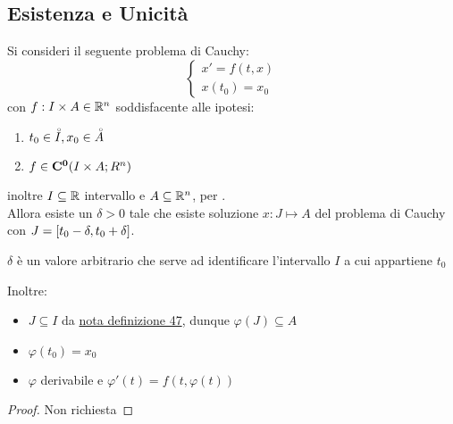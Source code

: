 \subsection{Esistenza e Unicità}
\begin{proposition}
	\label{teo:peano}
	Si consideri il seguente problema di Cauchy:
	$$\left\{\begin{matrix} x'=f(t,x)\\x(t_0)=x_0\end{matrix}\right.$$
	con $f:I\times A\in \mathbb{R}^n$ soddisfacente alle ipotesi:
	\begin{enumerate}
		\item $t_0\in \accentset{\circ}{I}, x_0\in \accentset{\circ}{A}$
		\item $f\in \mathbf{C^{0}}(I\times A;R^n)$
	\end{enumerate}
	inoltre $I\subseteq \mathbb{R}$ intervallo e $A\subseteq \mathbb{R}^n$, per .\\
	Allora esiste un $\delta>0$ tale che esiste soluzione $x:J\mapsto A$ del problema di Cauchy con $J=\left[t_0-\delta,t_0+\delta\right]$.
	\begin{note}
		$\delta$ è un valore arbitrario che serve ad identificare l'intervallo $I$ a cui appartiene $t_0$
	\end{note}
	\noindent Inoltre:
	\begin{itemize}
		\item $J\subseteq I$ da \hyperlink{note:diff_eq_sol_definit_set}{nota definizione 47}, dunque $\varphi(J)\subseteq A$
		\item $\varphi(t_0)=x_0$
		\item $\varphi$ derivabile e $\varphi'(t)=f(t,\varphi(t))$
	\end{itemize}
	\begin{proof}
		Non richiesta
	\end{proof}
\end{proposition}
